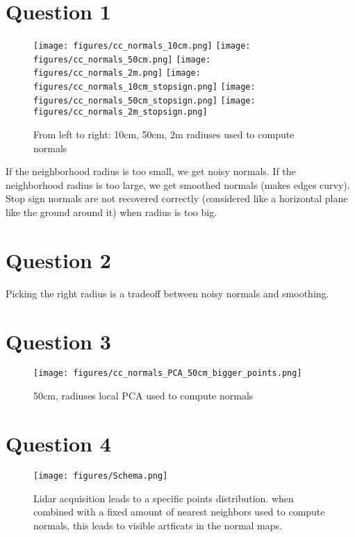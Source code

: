 \documentclass[a4paper]{article}
\begin{document}





\section*{Question 1}
\begin{figure}[ht]
  \centering
  \texttt{[image: figures/cc\_normals\_10cm.png]}
  \texttt{[image: figures/cc\_normals\_50cm.png]}
  \texttt{[image: figures/cc\_normals\_2m.png]}
  \texttt{[image: figures/cc\_normals\_10cm\_stopsign.png]}
  \texttt{[image: figures/cc\_normals\_50cm\_stopsign.png]}
  \texttt{[image: figures/cc\_normals\_2m\_stopsign.png]}
  \caption{From left to right: 10cm, 50cm, 2m radiuses used to compute normals}
  \label{fig:cc_normals}
\end{figure}
If the neighborhood radius is too small, we get noisy normals.
If the neighborhood radius is too large, we get smoothed normals (makes edges curvy).
Stop sign normals are not recovered correctly (considered like a horizontal plane like the ground around it) when radius is too big.


\section*{Question 2}
Picking the right radius is a tradeoff between noisy normals and smoothing.


\section*{Question 3}
\begin{figure}[ht]
  \centering
  \texttt{[image: figures/cc\_normals\_PCA\_50cm\_bigger\_points.png]}
  \caption{50cm, radiuses local PCA used to compute normals}
  \label{fig:local_pca}
\end{figure}


\section*{Question 4}
\begin{figure}[ht]
  \centering
  \texttt{[image: figures/Schema.png]}
  \caption{Lidar acquisition leads to a specific points distribution. when combined with a fixed amount
  of nearest neighbors used to compute normals, this leads to visible artficats in the normal maps.
  } 
  \label{fig:lidar}
\end{figure}
\end{document}
